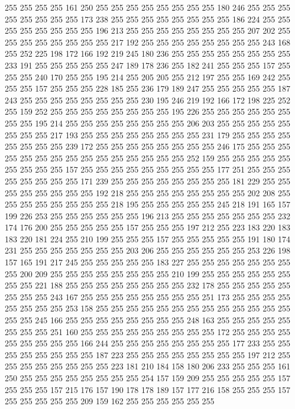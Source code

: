 255 255 255 255 161 250 255 255 255 255 255 255 255 255 180 246 255 255 255 255
255 255 255 255 173 238 255 255 255 255 255 255 255 255 186 224 255 255 255 255
255 255 255 255 196 213 255 255 255 255 255 255 255 255 207 202 255 255 255 255
255 255 255 255 217 192 255 255 255 255 255 255 255 255 243 168 255 252 225 198
172 166 192 219 245 180 236 255 255 255 255 255 255 255 255 233 191 255 255 255
255 255 247 189 178 236 255 182 241 255 255 255 157 255 255 255 240 170 255 255
195 214 255 205 205 255 212 197 255 255 169 242 255 255 255 157 255 255 255 228
185 255 236 179 189 247 255 255 255 255 255 187 243 255 255 255 255 255 255 255
255 230 195 246 219 192 166 172 198 225 252 255 159 252 255 255 255 255 255 255
255 255 195 226 255 255 255 255 255 255 255 255 195 214 255 255 255 255 255 255
255 255 206 203 255 255 255 255 255 255 255 255 217 193 255 255 255 255 255 255
255 255 231 179 255 255 255 255 255 255 255 255 239 172 255 255 255 255 255 255
255 255 246 175 255 255 255 255 255 255 255 255 255 255 255 255 255 255 255 252
159 255 255 255 255 255 255 255 255 255 157 255 255 255 255 255 255 255 255 255
177 251 255 255 255 255 255 255 255 255 171 239 255 255 255 255 255 255 255 255
181 229 255 255 255 255 255 255 255 255 192 218 255 255 255 255 255 255 255 255
202 208 255 255 255 255 255 255 255 255 218 195 255 255 255 255 255 245 218 191
165 157 199 226 253 255 255 255 255 255 255 196 213 255 255 255 255 255 255 255
232 174 176 200 255 255 255 255 255 157 255 255 255 197 212 255 223 183 220 183
183 220 181 224 255 210 199 255 255 255 157 255 255 255 255 255 191 180 174 231
255 255 255 255 255 255 255 203 206 255 255 255 255 255 255 253 226 198 157 165
191 217 245 255 255 255 255 255 183 227 255 255 255 255 255 255 255 255 200 209
255 255 255 255 255 255 255 255 210 199 255 255 255 255 255 255 255 255 221 188
255 255 255 255 255 255 255 255 232 178 255 255 255 255 255 255 255 255 243 167
255 255 255 255 255 255 255 255 251 173 255 255 255 255 255 255 255 255 253 158
255 255 255 255 255 255 255 255 255 255 255 255 255 255 255 245 166 255 255 255
255 255 255 255 255 248 163 255 255 255 255 255 255 255 255 251 160 255 255 255
255 255 255 255 255 255 172 255 255 255 255 255 255 255 255 255 166 244 255 255
255 255 255 255 255 255 177 233 255 255 255 255 255 255 255 255 187 223 255 255
255 255 255 255 255 255 197 212 255 255 255 255 255 255 255 255 223 181 210 184
158 180 206 233 255 255 255 161 250 255 255 255 255 255 255 255 255 254 157 159
209 255 255 255 255 255 157 255 255 255 157 215 176 157 190 178 178 189 157 177
216 158 255 255 255 157 255 255 255 255 255 209 159 162 255 255 255 255 255 255
